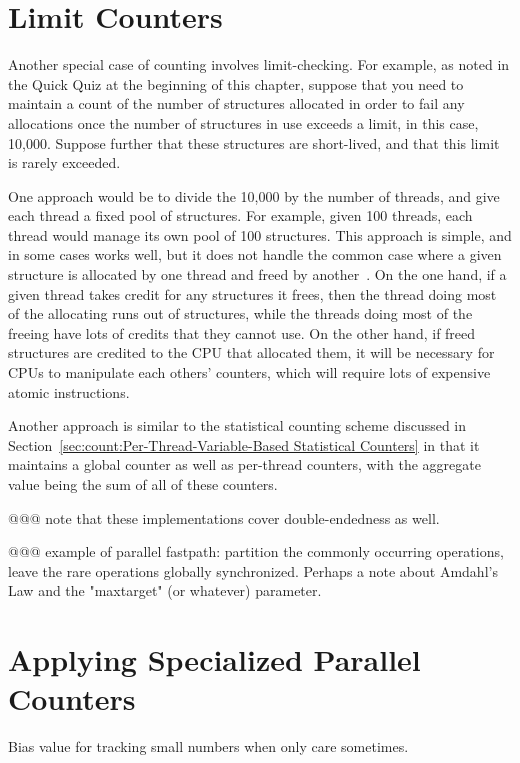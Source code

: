 \section{Limit Counters}
\label{sec:count:Limit Counters}

Another special case of counting involves limit-checking.
For example, as noted in the Quick Quiz at the beginning of this
chapter, suppose that you need to maintain a count of the number of
structures allocated in order to fail any allocations once the number
of structures in use exceeds a limit, in this case, 10,000.
Suppose further that these structures are short-lived, and that this
limit is rarely exceeded.

One approach would be to divide the 10,000 by the number of threads,
and give each thread a fixed pool of structures.
For example, given 100 threads, each thread would manage its own pool
of 100 structures.
This approach is simple, and in some cases works well, but it does not
handle the common case where a given structure is allocated by one
thread and freed by another~\cite{McKenney93}.
On the one hand, if a given thread takes credit for any structures it
frees, then the thread doing most of the allocating runs out
of structures, while the threads doing most of the freeing have lots
of credits that they cannot use.
On the other hand, if freed structures are credited to the CPU that
allocated them, it will be necessary for CPUs to manipulate each
others' counters, which will require lots of expensive atomic instructions.

Another approach is similar to the statistical counting scheme
discussed in
Section~\ref{sec:count:Per-Thread-Variable-Based Statistical Counters}
in that it maintains a global counter as well as per-thread counters,
with the aggregate value being the sum of all of these counters.

@@@ note that these implementations cover double-endedness as well.

@@@ example of parallel fastpath: partition the commonly occurring operations,
leave the rare operations globally synchronized.  Perhaps a note about
Amdahl's Law and the "maxtarget" (or whatever) parameter.

\section{Applying Specialized Parallel Counters}
\label{sec:count:Applying Specialized Parallel Counters}

Bias value for tracking small numbers when only care sometimes.

